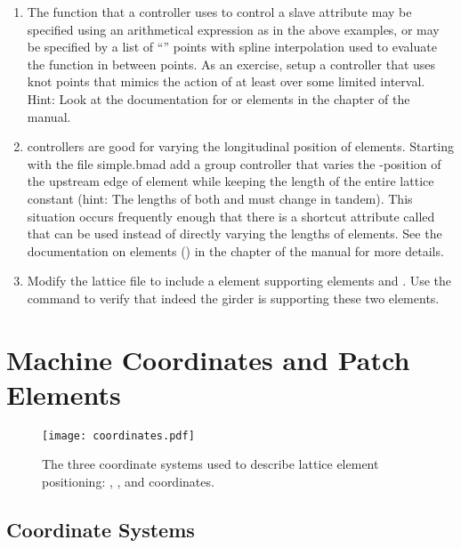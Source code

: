 \documentclass{hitec}     %
\newcommand{\Section}[1]{\section{#1}\vspace*{-1ex}}
\begin{document}
{\begin{enumerate}[label=\thesection.\arabic{enumi}]
\item 
The function that a controller uses to control a slave attribute may be specified using an
arithmetical expression as in the above examples, or may be specified by a list of ``''
points with spline interpolation used to evaluate the function in between points.  As an exercise,
setup a controller that uses knot points that mimics the action of  at least over some
limited interval. Hint: Look at the documentation for  or  elements in the
 chapter of the \bmad manual.
%
\item
{} controllers are good for varying the longitudinal position of elements. Starting with the
file simple.bmad add a group controller that varies the -position of the upstream edge of
element  while keeping the length of the entire lattice constant (hint: The lengths of both
 and  must change in tandem). This situation occurs frequently enough that there is a
shortcut attribute called  that can be used instead of directly varying the lengths
of elements. See the documentation on  elements () in the 
chapter of the \bmad manual for more details.
%
\item
Modify the lattice file  to include a  element supporting elements 
and . Use the  command to verify that indeed the girder is supporting these two
elements.
\end{enumerate}

\newpage

\Section{Machine Coordinates and Patch Elements}
\label{s:coords}

\begin{figure}[tb]
  \centering
  \texttt{[image: coordinates.pdf]}
  \caption{The three coordinate systems used to describe lattice element positioning:
, , and  coordinates.}
  \label{f:coordinates}
\end{figure}

\subsection{Coordinate Systems}
\label{s:coord.sys}

}
\end{document}
